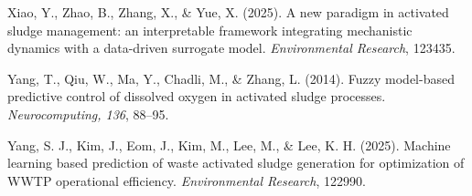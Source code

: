 \documentclass[11pt]{article}
\begin{document}
\noindent Xiao, Y., Zhao, B., Zhang, X., \& Yue, X. (2025). A new paradigm in activated sludge management: an interpretable framework integrating mechanistic dynamics with a data-driven surrogate model. \textit{Environmental Research}, 123435.

\noindent Yang, T., Qiu, W., Ma, Y., Chadli, M., \& Zhang, L. (2014). Fuzzy model-based predictive control of dissolved oxygen in activated sludge processes. \textit{Neurocomputing, 136}, 88--95.

\noindent Yang, S. J., Kim, J., Eom, J., Kim, M., Lee, M., \& Lee, K. H. (2025). Machine learning based prediction of waste activated sludge generation for optimization of WWTP operational efficiency. \textit{Environmental Research}, 122990.
\end{document}
